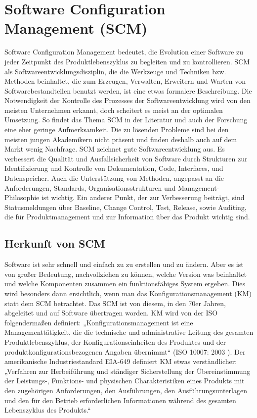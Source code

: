 \chapter{Software Configuration Management (\acs{SCM})}
Software Configuration Management bedeutet, die Evolution einer Software zu jeder Zeitpunkt des Produktlebenszyklus zu begleiten und zu kontrollieren. \acs{SCM} als Softwareentwicklungsdisziplin, die die Werkzeuge und Techniken bzw. Methoden beinhaltet, die zum Erzeugen, Verwalten, Erweitern und Warten von Softwarebestandteilen benutzt werden, ist eine etwas formalere Beschreibung. Die Notwendigkeit der Kontrolle des Prozesses der Softwareentwicklung wird von den meisten Unternehmen erkannt, doch scheitert es meist an der optimalen Umsetzung. So findet das Thema SCM in der Literatur und auch der Forschung eine eher geringe Aufmerksamkeit. Die zu lösenden Probleme sind bei den meisten jungen Akademikern nicht präsent und finden deshalb auch auf dem Markt wenig Nachfrage. SCM zeichnet gute Softwareentwicklung aus. Es verbessert die Qualität und Ausfallsicherheit von Software durch Strukturen zur Identifizierung und Kontrolle von Dokumentation, Code, Interfaces, und Datenspeicher. Auch die Unterstützung von Methoden, angepasst an die Anforderungen, Standards, Organisationsstrukturen und Management-Philosophie ist wichtig. Ein anderer Punkt, der zur Verbesserung beiträgt, sind Statusmeldungen über Baseline, Change Control, Test, Release, sowie Auditing, die für Produktmanagement und zur Information über das Produkt wichtig sind. 

\section{Herkunft von SCM}
Software ist sehr schnell und einfach zu zu erstellen und zu ändern. Aber es ist von großer Bedeutung, nachvollziehen zu können, welche Version was beinhaltet und welche Komponenten zusammen ein funktionsfähiges System ergeben. Dies wird besonders dann ersichtlich, wenn man das Konfigurationsmanagement (KM) statt dem SCM betrachtet. Das SCM ist von diesem, in den 70er Jahren, abgeleitet und auf Software übertragen worden. KM wird von der ISO folgendermaßen definiert: „Konfigurationsmanagement ist eine Managementtätigkeit, die die technische und administrative Leitung des gesamten Produktlebenszyklus, der Konfigurationseinheiten des Produktes und der produktkonfigurationsbezogenen Angaben übernimmt“ (\acs{ISO} 10007: 2003 \cite{km-hamburg}). Der amerikanische Industriestandard EIA-649 definiert KM etwas verständlicher: „Verfahren zur Herbeiführung und ständiger Sicherstellung der Übereinstimmung der Leistungs-, Funktions- und physischen Charakteristiken eines Produkts mit den zugehörigen Anforderungen, den Ausführungen, den Ausführungsunterlagen und den für den Betrieb erforderlichen Informationen während des gesamten Lebenszyklus des Produkts.“ \cite{gbt-km}

